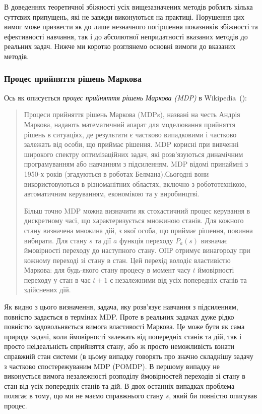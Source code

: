 \documentclass[a4paper,10pt,fleqn]{article}
\begin{document}
В доведеннях теоретичної збіжності усіх вищезазначених методів роблять кілька суттєвих припущень, які не завжди виконуються на практиці. Порушення цих вимог може призвести як до лише незначного погіршення показників збіжності та ефективності навчання, так і до абсолютної непридатності вказаних методів до реальних задач. Нижче ми коротко розглянемо основні вимоги до вказаних методів.

\subsubsection{Процес прийняття рішень Маркова}

Ось як описується \emph{процес прийняття рішень Маркова (MDP)} в Wikipedia~(\cite{WikiMDP}):
\begin{quotation}
	Процеси прийняття рішень Маркова (MDPs), названі на честь Андрія Маркова, надають математичний апарат для моделювання прийняття рішень в ситуаціях, де результати є частково випадковими і частково залежать від особи, що приймає рішення. MDP корисні при вивченні широкого спектру оптимізаційних задач, які розв'язуються динамічним програмуванням або навчанням з підсиленням. MDP відомі принаймні з 1950-х років (згадуються в роботах Белмана).Сьогодні вони використовуються в різноманітних областях, включно з робототехнікою, автоматичним керуванням, економікою та у виробинцтві.

	Більш точно MDP можна визначити як стохастичний процес керування в дискретному часі, що характеризується множиною станів. Для кожного стану визначена множина дій, з якої особа, що приймає рішення, повинна вибирати. Для стану $s$ та дії $a$ функція переходу $P_a(s)$ визначає ймовірності переходу до наступного стану. ОПР отримує винагороду при кожному переході зі стану в стан. Цей перехід володіє властивістю Маркова: для будь-якого стану процесу в момент часу $t$ ймовірності переходу у стан в час $t+1$ є незалежними від усіх попередніх станів та здійснених дій.
\end{quotation}

Як видно з цього визначення, задача, яку розв'язує навчання з підсиленням, повністю задається в термінах MDP. Проте в реальних задачах дуже рідко повністю задовольняється вимога властивості Маркова. Це може бути як сама природа задачі, коли ймовірності залежать від попередніх станів та дій, так і просто неідеальність сприйняття стану, або ж просто неможливість взнати справжній стан системи (в цьому випадку говорять про значно складнішу задачу з частково спостережуваним MDP (POMDP). В першому випадку не виконується вимога незалежності розподілу ймовірностей переходів зі стану в стан від усіх попередніх станів та дій. В двох останніх випадках проблема полягає в тому, що ми не маємо справжнього стану $s$, який би повністю описував процес.
\end{document}
